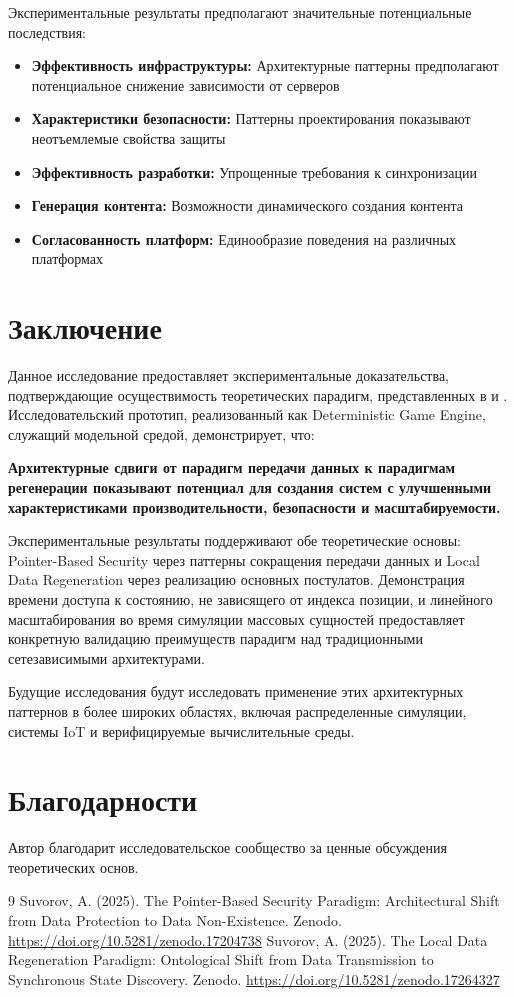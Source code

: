 \documentclass[14pt, a4paper]{extarticle}
\begin{document}
Экспериментальные результаты предполагают значительные потенциальные последствия:
\begin{itemize}
    \item \textbf{Эффективность инфраструктуры:} Архитектурные паттерны предполагают потенциальное снижение зависимости от серверов
    \item \textbf{Характеристики безопасности:} Паттерны проектирования показывают неотъемлемые свойства защиты
    \item \textbf{Эффективность разработки:} Упрощенные требования к синхронизации
    \item \textbf{Генерация контента:} Возможности динамического создания контента
    \item \textbf{Согласованность платформ:} Единообразие поведения на различных платформах
\end{itemize}

\section{Заключение}

Данное исследование предоставляет экспериментальные доказательства, подтверждающие осуществимость теоретических парадигм, представленных в \cite{suvorov2025pointer} и \cite{suvorov2025local}. Исследовательский прототип, реализованный как Deterministic Game Engine, служащий модельной средой, демонстрирует, что:

\textbf{Архитектурные сдвиги от парадигм передачи данных к парадигмам регенерации показывают потенциал для создания систем с улучшенными характеристиками производительности, безопасности и масштабируемости.}

Экспериментальные результаты поддерживают обе теоретические основы: Pointer-Based Security через паттерны сокращения передачи данных и Local Data Regeneration через реализацию основных постулатов. Демонстрация времени доступа к состоянию, не зависящего от индекса позиции, и линейного масштабирования во время симуляции массовых сущностей предоставляет конкретную валидацию преимуществ парадигм над традиционными сетезависимыми архитектурами.

Будущие исследования будут исследовать применение этих архитектурных паттернов в более широких областях, включая распределенные симуляции, системы IoT и верифицируемые вычислительные среды.

\section*{Благодарности}
Автор благодарит исследовательское сообщество за ценные обсуждения теоретических основ.

\begin{thebibliography}{9}
 Suvorov, A. (2025). The Pointer-Based Security Paradigm: Architectural Shift from Data Protection to Data Non-Existence. Zenodo. \url{https://doi.org/10.5281/zenodo.17204738}
 Suvorov, A. (2025). The Local Data Regeneration Paradigm: Ontological Shift from Data Transmission to Synchronous State Discovery. Zenodo. \url{https://doi.org/10.5281/zenodo.17264327}
\end{thebibliography}
\end{document}
